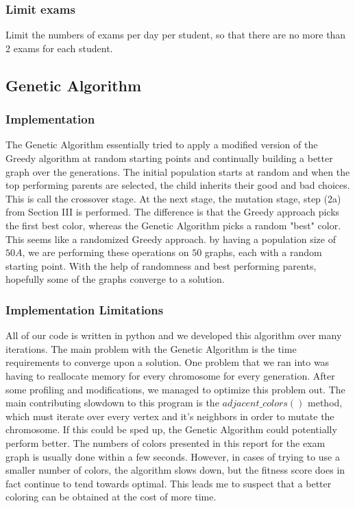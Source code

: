 \documentclass[12]{article}
\begin{document}
\subsubsection{Limit exams}
Limit the numbers of exams per day per student, so that there are no more than 2 exams for each student.

\subsection{Genetic Algorithm}
\subsubsection{Implementation}
The Genetic Algorithm essentially tried to apply a modified version of the Greedy algorithm at random starting points and continually building a better graph over the generations. The initial population starts at random and when the top performing parents are selected, the child inherits their good and bad choices. This is call the crossover stage. At the next stage, the mutation stage, step (2a) from Section III is performed. The difference is that the Greedy approach picks the first best color, whereas the Genetic Algorithm picks a random "best" color. This seems like a randomized Greedy approach. by having a population size of $50A$, we are performing these operations on $50$ graphs, each with a random starting point. With the help of randomness and best performing parents, hopefully some of the graphs converge to a solution.

\subsubsection{Implementation Limitations}
All of our code is written in python and we developed this algorithm over many iterations. The main problem with the Genetic Algorithm is the time requirements to converge upon a solution. One problem that we ran into was having to reallocate memory for every chromosome for every generation. After some profiling and modifications, we managed to optimize this problem out. The main contributing slowdown to this program is the $adjacent\_colors()$ method, which must iterate over every vertex and it's neighbors in order to mutate the chromosome. If this could be sped up, the Genetic Algorithm could potentially perform better. The numbers of colors presented in this report for the exam graph is usually done within a few seconds. However, in cases of trying to use a smaller number of colors, the algorithm slows down, but the fitness score does in fact continue to tend towards optimal. This leads me to suspect that a better coloring can be obtained at the cost of more time.
\end{document}
